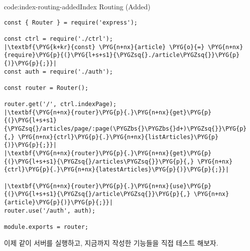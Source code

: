 \begin{code}{code:index-routing-added}{Index Routing (Added)}
\begin{verbatim}
const { Router } = require('express');

const ctrl = require('./ctrl');
|\textbf{\PYG{k+kr}{const} \PYG{n+nx}{article} \PYG{o}{=} \PYG{n+nx}{require}\PYG{p}{(}\PYG{l+s+s1}{\PYGZsq{}./article\PYGZsq{}}\PYG{p}{)}\PYG{p}{;}}|
const auth = require('./auth');

const router = Router();

router.get('/', ctrl.indexPage);
|\textbf{\PYG{n+nx}{router}\PYG{p}{.}\PYG{n+nx}{get}\PYG{p}{(}\PYG{l+s+s1}{\PYGZsq{}/articles/page/:page(\PYGZbs{}\PYGZbs{}d+)\PYGZsq{}}\PYG{p}{,} \PYG{n+nx}{ctrl}\PYG{p}{.}\PYG{n+nx}{listArticles}\PYG{p}{)}\PYG{p}{;}}|
|\textbf{\PYG{n+nx}{router}\PYG{p}{.}\PYG{n+nx}{get}\PYG{p}{(}\PYG{l+s+s1}{\PYGZsq{}/articles\PYGZsq{}}\PYG{p}{,} \PYG{n+nx}{ctrl}\PYG{p}{.}\PYG{n+nx}{latestArticles}\PYG{p}{)}\PYG{p}{;}}|

|\textbf{\PYG{n+nx}{router}\PYG{p}{.}\PYG{n+nx}{use}\PYG{p}{(}\PYG{l+s+s1}{\PYGZsq{}/article\PYGZsq{}}\PYG{p}{,} \PYG{n+nx}{article}\PYG{p}{)}\PYG{p}{;}}|
router.use('/auth', auth);

module.exports = router;
\end{verbatim}
\end{code}







이제 \와 같이 서버를 실행하고, 지금까지 작성한 기능들을 직접 테스트 해보자.
